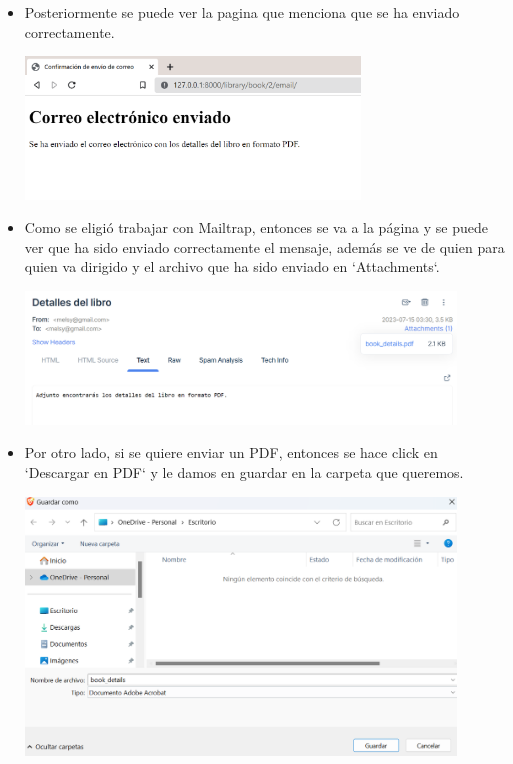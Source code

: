 \documentclass{article}
\begin{document}
\begin{itemize}
\item Posteriormente se puede ver la pagina que menciona que se ha enviado correctamente.

\begin{minipage}{\linewidth}
    \centering
    \includegraphics[width=0.70\textwidth]{imagenes/img8.png}
\end{minipage}
\vspace{\baselineskip}

\item Como se eligió trabajar con Mailtrap, entonces se va a la página y se puede ver que ha sido enviado correctamente el mensaje, además se ve de quien para quien va dirigido y el archivo que ha sido enviado en `Attachments`.

\begin{minipage}{\linewidth}
    \centering
    \includegraphics[width=0.90\textwidth]{imagenes/img9.png}
\end{minipage}
\vspace{\baselineskip}

\item Por otro lado, si se quiere enviar un PDF, entonces se hace click en `Descargar en PDF` y le damos en guardar en la carpeta que queremos.

\begin{minipage}{\linewidth}
    \centering
    \includegraphics[width=0.90\textwidth]{imagenes/img10.png}
\end{minipage}
\vspace{\baselineskip}


\end{itemize}
\end{document}
